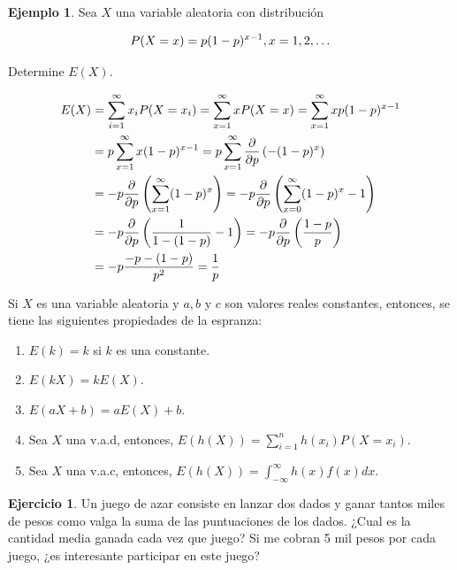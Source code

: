 \documentclass[
  11pt,
]{book}
\providecommand{\tightlist}{%
  \setlength{\itemsep}{0pt}\setlength{\parskip}{0pt}}
\theoremstyle{definition}
\theoremstyle{definition}
\newtheorem{example}{Ejemplo}[chapter]
\theoremstyle{definition}
\newtheorem{exercise}{Ejercicio}[chapter]
\theoremstyle{definition}
\theoremstyle{remark}
\begin{document}
\begin{example}

Sea \(X\) una variable aleatoria con distribución

\begin{equation}
\notag
P(X=x) = p(1-p)^{x-1}, x = 1,2,\ldots
\end{equation}

Determine \(E(X)\).

\begin{equation}
\notag
\begin{split}
E(X) &= \sum_{i=1}^{\infty}x_iP(X=x_i) = \sum_{x=1}^{\infty}xP(X=x)  = \sum_{x=1}^{\infty}xp(1-p)^{x-1}\\ 
&= p\sum_{x=1}^{\infty}x(1-p)^{x-1}  = p\sum_{x=1}^{\infty}\frac{\partial}{\partial p}\left(-(1-p)^{x}\right)\\ 
&= -p\frac{\partial}{\partial p}\left(\sum_{x=1}^{\infty}(1-p)^{x}\right)  = -p\frac{\partial}{\partial p}\left(\sum_{x=0}^{\infty}(1-p)^{x}-1\right)\\ 
&= -p\frac{\partial}{\partial p}\left(\frac{1}{1-(1-p)}-1\right) =  -p\frac{\partial}{\partial p}\left(\frac{1-p}{p}\right)\\ 
&= -p\frac{-p - (1-p)}{p^2} = \frac{1}{p}
\end{split}
\end{equation}

\end{example}

Si \(X\) es una variable aleatoria y \(a,b\) y \(c\) son valores reales constantes, entonces, se tiene las siguientes propiedades de la espranza:

\begin{enumerate}
\def\labelenumi{\arabic{enumi}.}
\tightlist
\item
  \(E(k) = k\) si \(k\) es una constante.
\item
  \(E(kX) = kE(X)\).
\item
  \(E(aX+b) = aE(X) + b\).
\item
  Sea \(X\) una v.a.d, entonces, \(E(h(X)) = \displaystyle\sum_{i=1}^n h(x_i)P(X = x_i)\).
\item
  Sea \(X\) una v.a.c, entonces, \(E(h(X)) = \displaystyle\int_{-\infty}^{\infty} h(x)f(x)dx\).
\end{enumerate}

\begin{exercise}
Un juego de azar consiste en lanzar dos dados y ganar tantos miles de pesos como valga la suma de las puntuaciones de los dados. ¿Cual es la cantidad media ganada cada vez que juego? Si me cobran 5 mil pesos por cada juego, ¿es interesante participar en este juego?
\end{exercise}
\end{document}
